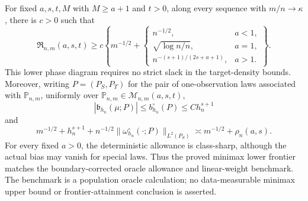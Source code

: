For fixed \(a,s,t,M\) with \(M\ge a+1\) and \(t>0\), along every sequence with \(m/n\to\kappa\), there is \(c>0\) such that
\[
\mathfrak R_{n,m}(a,s,t)\ge c\left\{m^{-1/2}+\begin{cases}
n^{-1/2},&a<1,\\
\sqrt{\log n/n},&a=1,\\
n^{-(s+1)/(2s+a+1)},&a>1.
\end{cases}\right\}.
\]
This lower phase diagram requires no strict slack in the target-density bounds. Moreover, writing \(P=(P_S,P_T)\) for the pair of one-observation laws associated with \(\mathbb P_{n,m}\), uniformly over \(\mathbb P_{n,m}\in\mathcal M_{n,m}(a,s,t)\),
\[
|\mathfrak b_{h_n}(\mu;P)|\le b_{h_n}^{\circ}(P)\le C h_n^{s+1}
\]
and
\[
m^{-1/2}+h_n^{s+1}
+n^{-1/2}\|\omega_{h_n}^{\circ}(\cdot;P)\|_{L^2(P_S)}
\asymp m^{-1/2}+\rho_n(a,s).
\]
For every fixed \(a>0\), the deterministic allowance is class-sharp, although the actual bias may vanish for special laws. Thus the proved minimax lower frontier matches the boundary-corrected oracle allowance and linear-weight benchmark. The benchmark is a population oracle calculation; no data-measurable minimax upper bound or frontier-attainment conclusion is asserted.
